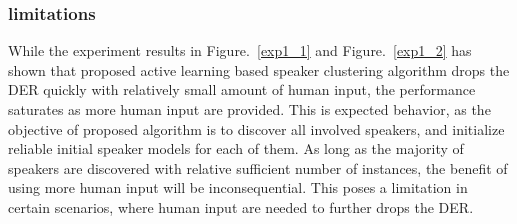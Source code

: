 \documentclass[journal]{IEEEtran}
\begin{document}
\subsubsection{limitations}
While the experiment results in Figure.~\ref{exp1_1} and Figure.~\ref{exp1_2} has shown that proposed active learning based speaker clustering algorithm drops the DER quickly with relatively small amount of human input, the performance saturates as more human input are provided. This is expected behavior, as the objective of proposed algorithm is to discover all involved speakers, and initialize reliable initial speaker models for each of them. As long as the majority of speakers are discovered with relative sufficient number of instances, the benefit of using more human input will be inconsequential. This poses a limitation in certain scenarios, where human input are needed to further drops the DER.
\end{document}
